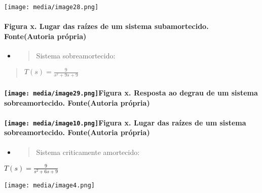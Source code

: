 \documentclass[]{article}
\let\oldparagraph\paragraph
\renewcommand{\paragraph}[1]{\oldparagraph{#1}\mbox{}}
\begin{document}
\texttt{[image: media/image28.png]}

\paragraph{Figura x. Lugar das raízes de um sistema subamortecido.
Fonte(Autoria
própria)}\label{figura-x.-lugar-das-rauxedzes-de-um-sistema-subamortecido.-fonteautoria-pruxf3pria}

\begin{itemize}
\item
  \begin{quote}
  Sistema sobreamortecido:
  \end{quote}
\end{itemize}

\begin{quote}
\(T(s) = \frac{9}{s^{2} + 9s + 9}\)
\end{quote}

\paragraph{\texorpdfstring{\protect\texttt{[image: media/image29.png]}\textbf{Figura
x. Resposta ao degrau de um sistema s}obre\textbf{amortecido.
Fonte(Autoria
própria)}}{Figura x. Resposta ao degrau de um sistema sobreamortecido. Fonte(Autoria própria)}}\label{figura-x.-resposta-ao-degrau-de-um-sistema-sobreamortecido.-fonteautoria-pruxf3pria}

\paragraph{\texorpdfstring{\protect\texttt{[image: media/image10.png]}\textbf{Figura
x. Lugar das raízes de um sistema s}obrea\textbf{mortecido.
Fonte(Autoria
própria)}}{Figura x. Lugar das raízes de um sistema sobreamortecido. Fonte(Autoria própria)}}\label{figura-x.-lugar-das-rauxedzes-de-um-sistema-sobreamortecido.-fonteautoria-pruxf3pria}

\begin{itemize}
\item
  \begin{quote}
  Sistema criticamente amortecido:
  \end{quote}
\end{itemize}

\(T(s) = \frac{9}{s^{2} + 6s + 9}\)

\texttt{[image: media/image4.png]}
\end{document}
